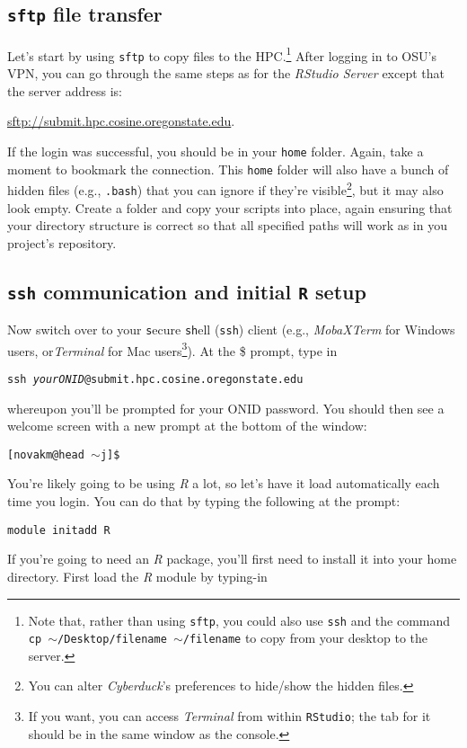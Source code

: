 \documentclass[12pt,letterpaper]{article}
\begin{document}
\subsection{\texttt{sftp} file transfer}

Let's start by using \texttt{sftp} to copy files to the HPC.\footnote{Note that,
rather than using \texttt{sftp}, you could also use \texttt{ssh} and the command \texttt{cp $\sim$/Desktop/filename $\sim$/filename} to copy from your desktop to the server.}
After logging in to OSU's VPN, you can go through the same steps as for the \emph{RStudio Server}
except that the server address is:

\url{sftp://submit.hpc.cosine.oregonstate.edu}.

\noindent
If the login was successful, you should be in your \texttt{home} folder.
Again, take a moment to bookmark the connection.
This \texttt{home} folder will also have a bunch of hidden files (e.g., \texttt{.bash}) that you can ignore if
they're visible\footnote{You can alter \emph{Cyberduck}'s preferences to hide/show the hidden files.},
but it may also look empty.
Create a folder and copy your scripts into place, again ensuring that your directory structure is correct so that all specified paths will work as in you project's repository.

\subsection{\texttt{ssh} communication and initial \texttt{R} setup}
Now switch over to your \texttt{s}ecure \texttt{sh}ell (\texttt{ssh}) client (e.g., \emph{MobaXTerm} for Windows users, or\emph{Terminal} for Mac users\footnote{If you want, you can access \emph{Terminal} from within
\texttt{RStudio}; the tab for it should be in the same window as the console.}).
At the \$ prompt, type in

\texttt{ssh \emph{yourONID}@submit.hpc.cosine.oregonstate.edu}

\noindent
whereupon you'll be prompted for your ONID password.
You should then see a welcome screen with a new prompt at the bottom of the window:

\texttt{[novakm@head $\sim$j]\$}

\noindent
You're likely going to be using \emph{R} a lot, so let's have it load automatically each time you login.
You can do that by typing the following at the prompt:

\texttt{module initadd R}

\noindent
If you're going to need an \emph{R} package, you'll first need to install it into your home directory.
First load the \emph{R} module by typing-in
\end{document}

